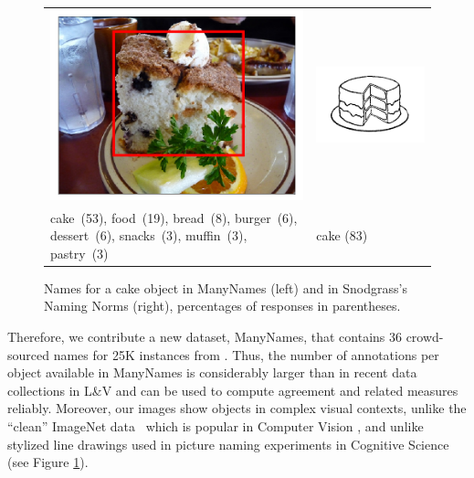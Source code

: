 \begin{figure}[tbp]
\scriptsize
\begin{tabular}{p{4.3cm}p{2cm}}
\centering
\includegraphics[scale=0.15]{figures/2390077_1254219_supercat_unique.png} &
\includegraphics[scale=0.4]{figures/snodgrass_vanderwart_cake_042.png}\\
 cake\ (53),  food\ (19), bread\ (8), burger\ (6), dessert\ (6), snacks\ (3), muffin\ (3),  pastry\ (3) & \hspace{.9cm} cake (83)
\end{tabular}
\caption{Names for a cake object in ManyNames (left) and in Snodgrass's Naming Norms (right), percentages of responses in parentheses.}
\label{fig:cake}
\end{figure}



Therefore, we contribute a new dataset, ManyNames, that contains 36 crowd-sourced names for 25K instances from \vg. Thus, the number of annotations per object available in ManyNames is considerably larger than in recent data collections in L\&V and can be used to compute agreement and related measures reliably.
Moreover, our images show objects in complex visual contexts,
unlike the ``clean'' ImageNet data~\cite{imagenet_cvpr09} which is popular in Computer Vision \cite{ILSVRC15}, and unlike stylized line drawings used in picture naming experiments in Cognitive Science (see Figure \ref{fig:cake}).
%

